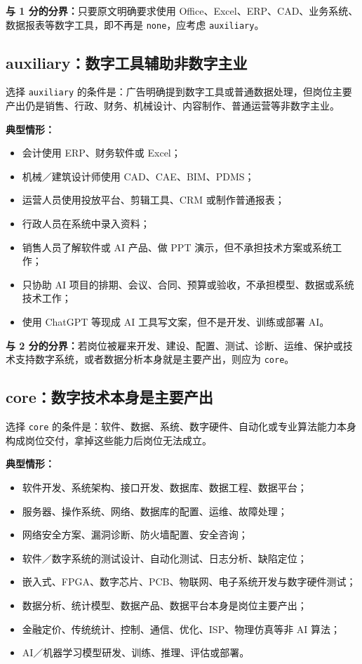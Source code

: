 \documentclass[11pt,a4paper,fontset=none]{ctexart}
\begin{document}
\textbf{与 1 分的分界：}只要原文明确要求使用 Office、Excel、ERP、CAD、业务系统、数据报表等数字工具，即不再是 \texttt{none}，应考虑 \texttt{auxiliary}。

\subsection{auxiliary：数字工具辅助非数字主业}

选择 \texttt{auxiliary} 的条件是：广告明确提到数字工具或普通数据处理，但岗位主要产出仍是销售、行政、财务、机械设计、内容制作、普通运营等非数字主业。

\textbf{典型情形：}
\begin{itemize}
  \item 会计使用 ERP、财务软件或 Excel；
  \item 机械／建筑设计师使用 CAD、CAE、BIM、PDMS；
  \item 运营人员使用投放平台、剪辑工具、CRM 或制作普通报表；
  \item 行政人员在系统中录入资料；
  \item 销售人员了解软件或 AI 产品、做 PPT 演示，但不承担技术方案或系统工作；
  \item 只协助 AI 项目的排期、会议、合同、预算或验收，不承担模型、数据或系统技术工作；
  \item 使用 ChatGPT 等现成 AI 工具写文案，但不是开发、训练或部署 AI。
\end{itemize}

\textbf{与 2 分的分界：}若岗位被雇来开发、建设、配置、测试、诊断、运维、保护或技术支持数字系统，或者数据分析本身就是主要产出，则应为 \texttt{core}。

\subsection{core：数字技术本身是主要产出}

选择 \texttt{core} 的条件是：软件、数据、系统、数字硬件、自动化或专业算法能力本身构成岗位交付，拿掉这些能力后岗位无法成立。

\textbf{典型情形：}
\begin{itemize}
  \item 软件开发、系统架构、接口开发、数据库、数据工程、数据平台；
  \item 服务器、操作系统、网络、数据库的配置、运维、故障处理；
  \item 网络安全方案、漏洞诊断、防火墙配置、安全咨询；
  \item 软件／数字系统的测试设计、自动化测试、日志分析、缺陷定位；
  \item 嵌入式、FPGA、数字芯片、PCB、物联网、电子系统开发与数字硬件测试；
  \item 数据分析、统计模型、数据产品、数据平台本身是岗位主要产出；
  \item 金融定价、传统统计、控制、通信、优化、ISP、物理仿真等非 AI 算法；
  \item AI／机器学习模型研发、训练、推理、评估或部署。
\end{itemize}
\end{document}
